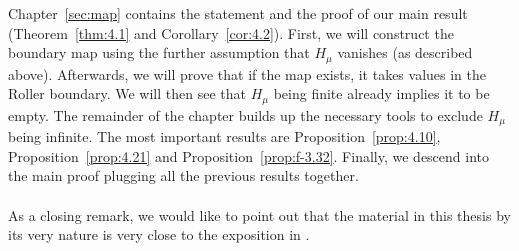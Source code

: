 Chapter~\ref{sec:map} contains the statement and the proof of our main result (Theorem~\ref{thm:4.1} and Corollary~\ref{cor:4.2}). First, we will construct the boundary map using the further assumption that \(H_\mu\) vanishes (as described above). Afterwards, we will prove that if the map exists, it takes values in the Roller boundary. We will then see that \(H_\mu\) being finite already implies it to be empty. The remainder of the chapter builds up the necessary tools to exclude \(H_\mu\) being infinite. The most important results are Proposition~\ref{prop:4.10}, Proposition~\ref{prop:4.21} and Proposition~\ref{prop:f-3.32}. Finally, we descend into the main proof plugging all the previous results together.
\\
\\
As a closing remark, we would like to point out that the material in this thesis by its very nature is very close to the exposition in \textcite{MR3509968}.
